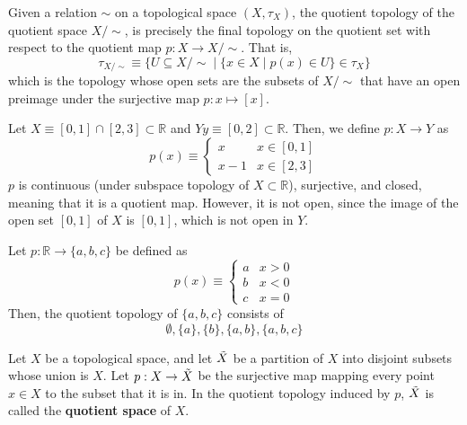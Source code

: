     \begin{proposition}
      Given a relation $\sim$ on a topological space $(X, \tau_X)$, the quotient topology of the quotient space $X / \sim$, is precisely the final topology on the quotient set with respect to the quotient map $p: X \rightarrow X / \sim$. That is, 
      \begin{equation}
        \tau_{X / \sim} \equiv \big\{U \subseteq X / \sim \; | \; \{x \in X \; | \; p(x) \in U\} \in \tau_X \big\}
      \end{equation}
      which is the topology whose open sets are the subsets of $X / \sim$ that have an open preimage under the surjective map $p: x \mapsto [x]$. 
    \end{proposition}

    \begin{example}
      Let $X \equiv [0,1] \cap [2,3] \subset \mathbb{R}$ and $Y y \equiv [0,2] \subset \mathbb{R}$. Then, we define $p: X \rightarrow Y$ as 
      \begin{equation}
        p(x) \equiv \begin{cases} x & x \in [0,1] \\ x-1 & x \in [2,3] \end{cases}
      \end{equation}
      $p$ is continuous (under subspace topology of $X \subset \mathbb{R}$), surjective, and closed, meaning that it is a quotient map. However, it is not open, since the image of the open set $[0,1]$ of $X$ is $[0,1]$, which is not open in $Y$. 
    \end{example}

    \begin{example}
      Let $p: \mathbb{R} \rightarrow \{a, b, c\}$ be defined as 
      \begin{equation}
        p(x) \equiv \begin{cases} a & x > 0 \\ b & x < 0 \\ c & x = 0 \end{cases}
      \end{equation}
      Then, the quotient topology of $\{a, b, c\}$ consists of 
      \begin{equation}
        \emptyset, \{a\}, \{b\}, \{a, b\}, \{a, b, c\}
      \end{equation}
    \end{example}

    \begin{definition}
      Let $X$ be a topological space, and let $\Tilde{X}$ be a partition of $X$ into disjoint subsets whose union is $X$. Let $p: X \rightarrow \Tilde{X}$ be the surjective map mapping every point $x \in X$ to the subset that it is in. In the quotient topology induced by $p$, $\Tilde{X}$ is called the \textbf{quotient space} of $X$. 
    \end{definition}

